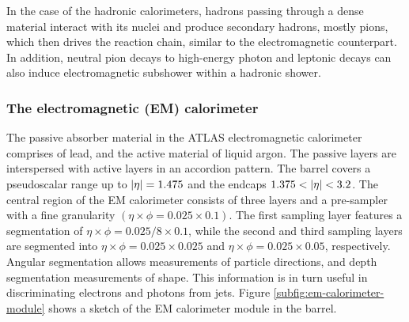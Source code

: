 In the case of the hadronic calorimeters, hadrons passing through a dense material interact with its nuclei and produce secondary hadrons, mostly pions, which then drives the reaction chain, similar to the electromagnetic counterpart. In addition, neutral pion decays to high-energy photon and leptonic decays can also induce electromagnetic subshower within a hadronic shower. 

\subsubsection{The electromagnetic (EM) calorimeter}
The passive absorber material in the ATLAS electromagnetic calorimeter comprises of lead, and the active material of liquid argon. The passive layers are interspersed with active layers in an accordion pattern. The barrel covers a pseudoscalar range up to $\abs{\eta} = 1.475$ and the endcaps $1.375 < \abs{\eta}<3.2$. The central region of the EM calorimeter consists of three layers and a pre-sampler with a fine granularity $(\eta\times\phi=0.025\times 0.1)$. The first sampling layer features a segmentation of $\eta\times\phi=0.025/8\times 0.1$, while the second and third sampling layers are segmented into $\eta\times\phi=0.025\times 0.025$ and $\eta\times\phi=0.025\times 0.05$, respectively. Angular segmentation allows measurements of particle directions, and depth segmentation measurements of shape. This information is in turn useful in discriminating electrons and photons from jets. Figure \ref{subfig:em-calorimeter-module} shows a sketch of the EM calorimeter module in the barrel. 

